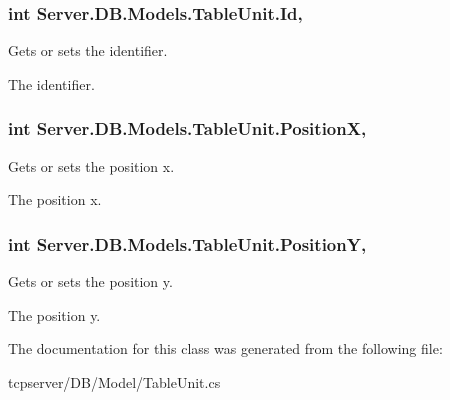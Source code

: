 \subsubsection[{Id}]{\setlength{\rightskip}{0pt plus 5cm}int Server.\+D\+B.\+Models.\+Table\+Unit.\+Id\hspace{0.3cm}{\ttfamily [get]}, {\ttfamily [set]}}\label{classServer_1_1DB_1_1Models_1_1TableUnit_a6b41f5c204d9a336e057de1ea5bc7602}


Gets or sets the identifier. 

The identifier.\hypertarget{classServer_1_1DB_1_1Models_1_1TableUnit_ac3f6fbba28d575332fb8272acea1ede7}{}
\subsubsection[{Position\+X}]{\setlength{\rightskip}{0pt plus 5cm}int Server.\+D\+B.\+Models.\+Table\+Unit.\+Position\+X\hspace{0.3cm}{\ttfamily [get]}, {\ttfamily [set]}}\label{classServer_1_1DB_1_1Models_1_1TableUnit_ac3f6fbba28d575332fb8272acea1ede7}


Gets or sets the position x. 

The position x.\hypertarget{classServer_1_1DB_1_1Models_1_1TableUnit_a9f536f4d39ce82ef7071734b2037fde8}{}
\subsubsection[{Position\+Y}]{\setlength{\rightskip}{0pt plus 5cm}int Server.\+D\+B.\+Models.\+Table\+Unit.\+Position\+Y\hspace{0.3cm}{\ttfamily [get]}, {\ttfamily [set]}}\label{classServer_1_1DB_1_1Models_1_1TableUnit_a9f536f4d39ce82ef7071734b2037fde8}


Gets or sets the position y. 

The position y.

The documentation for this class was generated from the following file\+:\begin{DoxyCompactItemize}
\item 
tcpserver/\+D\+B/\+Model/Table\+Unit.\+cs\end{DoxyCompactItemize}
